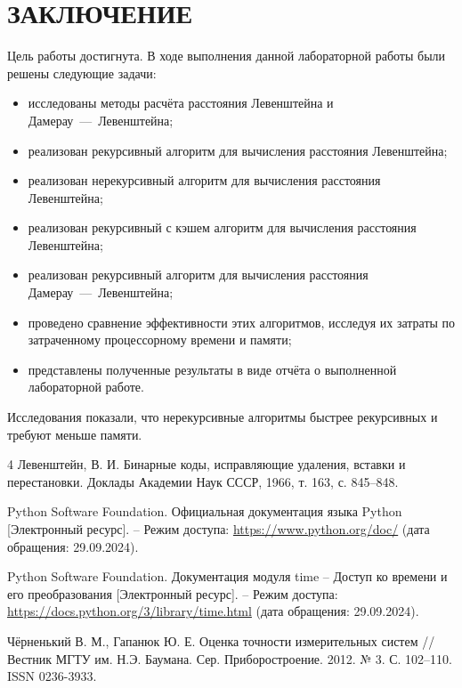 \documentclass[a4paper, 12pt]{extreport}
\begin{document}
\chapter*{ЗАКЛЮЧЕНИЕ}
Цель работы достигнута. В ходе выполнения данной лабораторной работы были решены следующие задачи:
\begin{itemize}
    \item[--] исследованы методы расчёта расстояния Левенштейна и Дамерау~---~Левенштейна;
    \item[--] реализован рекурсивный алгоритм для вычисления расстояния Левенштейна;
    \item[--] реализован нерекурсивный алгоритм для вычисления расстояния Левенштейна;
    \item[--] реализован рекурсивный с кэшем алгоритм для вычисления расстояния Левенштейна;
    \item[--] реализован рекурсивный алгоритм для вычисления расстояния Дамерау~---~Левенштейна;
    \item[--] проведено сравнение эффективности этих алгоритмов, исследуя их затраты по затраченному процессорному времени и памяти;
    \item[--] представлены полученные результаты в виде отчёта о выполненной лабораторной работе.
\end{itemize}

Исследования показали, что нерекурсивные алгоритмы быстрее рекурсивных и требуют меньше памяти.

\renewcommand{\bibname}{СПИСОК ИСПОЛЬЗОВАННЫХ ИСТОЧНИКОВ}
\begin{thebibliography}{4}
    Левенштейн, В. И. Бинарные коды, исправляющие удаления, вставки и перестановки. Доклады Академии Наук СССР, 1966, т. 163, с. 845–848.

    Python Software Foundation. Официальная документация языка Python [Электронный ресурс]. -- Режим доступа: \mbox{\url{https://www.python.org/doc/}} (дата обращения: 29.09.2024).
    
    Python Software Foundation. Документация модуля time -- Доступ ко времени и его преобразования [Электронный ресурс]. -- Режим доступа: \mbox{\url{https://docs.python.org/3/library/time.html}} (дата обращения: 29.09.2024).
    
    Чёрненький В. М., Гапанюк Ю. Е. Оценка точности измерительных систем // Вестник МГТУ им. Н.Э. Баумана. Сер. Приборостроение. 2012. № 3. С. 102–110. ISSN 0236-3933.

\end{thebibliography}

\end{document}
